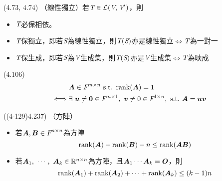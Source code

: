 \item \begin{theorem}{(4.73, 4.74)} （線性獨立）若$\textit{T} \in \mathcal{L}(\textit{V}, \textit{V}')$，則
	\begin{itemize}
		\item $\textit{T}$必保相依。
		\item $\textit{T}$保獨立，即若$\textit{S}$為線性獨立，則$\textit{T}(\textit{S})$亦是線性獨立$\iff$$\textit{T}$為一對一
		\item $\textit{T}$保生成，即若$\textit{S}$為$\textit{V}$生成集，則$\textit{T}(\textit{S})$亦是$\textit{V}$生成集$\iff$$\textit{T}$為映成
	\end{itemize}
\end{theorem}

\item \begin{theorem}{(4.106)} \quad\quad \begin{equation}
		\begin{aligned}
			& \mat{A} \in \F^{m \times n} \ \text{s.t.} \ \rnk(\mat{A}) = 1 \\ 
			\iff & \exists \ \vec{u} \neq \vec{0} \in \F^{m \times 1}, \ \vec{v} \neq 0 \in \F^{1 \times n}, \ \text{s.t.} \ \mat{A} = \vec{uv}	
		\end{aligned}
	\end{equation}
\end{theorem}

\item \begin{theorem}{((4-129)4.237)} （方陣）\begin{itemize}
		\item 若$\boldsymbol{A}, \boldsymbol{B} \in \textit{F}^{n \times n}$為方陣 \begin{equation}
			\operatorname{rank}(\boldsymbol{A}) + \operatorname{rank}(\boldsymbol{B}) - n \le \operatorname{rank}(\boldsymbol{AB})
		\end{equation}
		\item 若$\boldsymbol{A}_1, \ \cdots, \ \boldsymbol{A}_k \in \mathbb{R}^{n \times n}$為方陣，且$\boldsymbol{A}_1\cdots\boldsymbol{A}_k = \boldsymbol{O}$，則\begin{equation}
			\operatorname{rank}(\boldsymbol{A}_1) + \operatorname{rank}(\boldsymbol{A}_2) + \cdots + \operatorname{rank}(\boldsymbol{A}_k) \le (k - 1)n 
		\end{equation} 
	\end{itemize}
\end{theorem}


